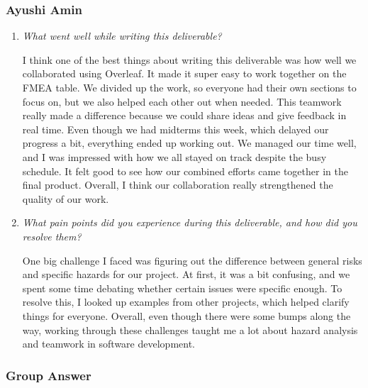 \documentclass{article}
\newcounter{hazard}
\begin{document}
\subsubsection*{Ayushi Amin}

\begin{enumerate}
  \item \textit{What went well while writing this deliverable?}
  
  I think one of the best things about writing this deliverable was how well we collaborated using Overleaf. It made it super easy to 
  work together on the FMEA table. We divided up the work, so everyone had their own sections to focus on, but we also helped each 
  other out when needed. This teamwork really made a difference because we could share ideas and give feedback in real time.
  Even though we had midterms this week, which delayed our progress a bit, everything ended up working out. We managed our time well, 
  and I was impressed with how we all stayed on track despite the busy schedule. It felt good to see how our combined efforts came 
  together in the final product. Overall, I think our collaboration really strengthened the quality of our work.

  \item \textit{What pain points did you experience during this deliverable, and how did you resolve them?}
  
  One big challenge I faced was figuring out the difference between general risks and specific hazards for our project. At first, it was 
  a bit confusing, and we spent some time debating whether certain issues were specific enough. To resolve this, I looked up examples from
  other projects, which helped clarify things for everyone. Overall, even though there were some bumps along the way, working through these 
  challenges taught me a lot about hazard analysis and teamwork in software development.
  
\end{enumerate}

\subsubsection*{Group Answer}
\end{document}

